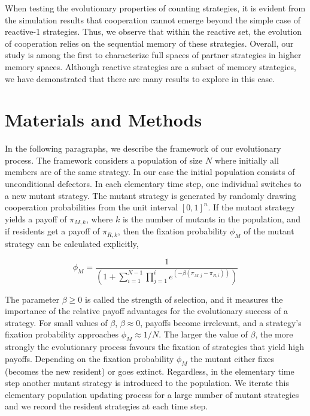\documentclass[11pt]{article}
\begin{document}
When testing the evolutionary properties of counting strategies, it is evident
from the simulation results that cooperation cannot emerge beyond the simple
case of reactive-1 strategies. Thus, we observe that within the reactive set,
the evolution of cooperation relies on the sequential memory of these strategies.
Overall, our study is among the first to characterize full spaces of partner
strategies in higher memory spaces. Although reactive strategies are a subset of
memory strategies, we have demonstrated that there are many results to explore
in this case.

\section*{Materials and Methods}\label{section:materials_and_methods}

In the following paragraphs, we describe the framework of our evolutionary
process. The framework considers a population of size \(N\) where initially all
members are of the same strategy. In our case the initial population consists of
unconditional defectors. In each elementary time step, one individual switches
to a new mutant strategy. The mutant strategy is generated by randomly drawing
cooperation probabilities from the unit interval \([0,1]^n\). If the mutant
strategy yields a payoff of \(\pi_{M, k}\), where \(k\) is the number of
mutants in the population, and if residents get a payoff of \(\pi_{R,
k}\), then the fixation probability \(\phi_{M}\) of the mutant strategy can be
calculated explicitly,

\begin{equation}\label{eq:fixation_probability}
  \phi_{M} = \frac{1}{\left(1 + \displaystyle \sum_{i=1}^{N - 1} \prod_{j=1}^{i} e^{(- \beta (\pi_{M, j} - \pi_{R, i}))} \right)}
\end{equation}

The parameter \(\beta \geq 0\) is called the strength of selection, and it
measures the importance of the relative payoff advantages for the evolutionary
success of a strategy. For small values of \(\beta\), \(\beta \approx 0\),
payoffs become irrelevant, and a strategy's fixation probability approaches
\(\phi_{M} \approx 1 / N\). The larger the value of \(\beta\), the more strongly
the evolutionary process favours the fixation of strategies that yield high
payoffs.
Depending on the fixation probability \(\phi_{M}\) the mutant either fixes
(becomes the new resident) or goes extinct. Regardless, in the elementary time
step another mutant strategy is introduced to the  population. We iterate this
elementary population updating process for a large number of mutant strategies
and we record the resident strategies at each time step.
\end{document}
